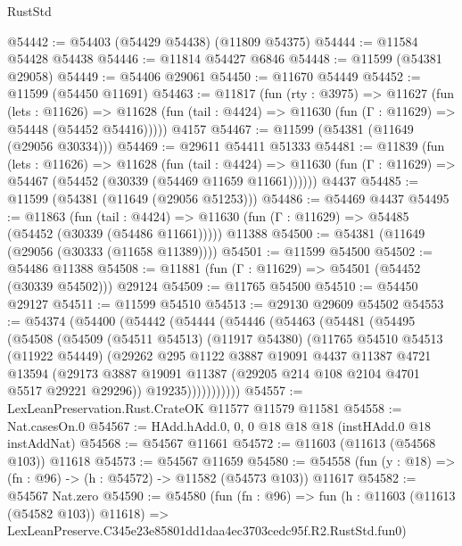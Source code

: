 \begin{lexlean}{RustStd}
\begin{coremodule}
@54442 := @54403 (@54429 @54438) (@11809 @54375)
@54444 := @11584 @54428 @54438
@54446 := @11814 @54427 @6846
@54448 := @11599 (@54381 @29058)
@54449 := @54406 @29061
@54450 := @11670 @54449
@54452 := @11599 (@54450 @11691)
@54463 := @11817
    (fun (rty : @3975) =>
    @11627
      (fun (lets : @11626) =>
      @11628 (fun (tail : @4424) => @11630 (fun (Γ : @11629) => @54448 (@54452 @54416)))))
    @4157
@54467 := @11599 (@54381 (@11649 (@29056 @30334)))
@54469 := @29611 @54411 @51333
@54481 := @11839
    (fun (lets : @11626) =>
    @11628
      (fun (tail : @4424) =>
      @11630 (fun (Γ : @11629) => @54467 (@54452 (@30339 (@54469 @11659 @11661))))))
    @4437
@54485 := @11599 (@54381 (@11649 (@29056 @51253)))
@54486 := @54469 @4437
@54495 := @11863
    (fun (tail : @4424) => @11630 (fun (Γ : @11629) => @54485 (@54452 (@30339 (@54486 @11661)))))
    @11388
@54500 := @54381 (@11649 (@29056 (@30333 (@11658 @11389))))
@54501 := @11599 @54500
@54502 := @54486 @11388
@54508 := @11881 (fun (Γ : @11629) => @54501 (@54452 (@30339 @54502))) @29124
@54509 := @11765 @54500
@54510 := @54450 @29127
@54511 := @11599 @54510
@54513 := @29130 @29609 @54502
@54553 := @54374
    (@54400
      (@54442
        (@54444
          (@54446
            (@54463
              (@54481
                (@54495
                  (@54508
                    (@54509
                      (@54511 @54513)
                      (@11917 @54380)
                      (@11765
                        @54510
                        @54513
                        (@11922 @54449)
                        (@29262
                          @295
                          @1122
                          @3887
                          @19091
                          @4437
                          @11387
                          @4721
                          @13594
                          (@29173
                            @3887
                            @19091
                            @11387
                            (@29205 @214 @108 @2104 @4701 @5517 @29221 @29296))
                          @19235)))))))))))
@54557 := LexLeanPreservation.Rust.CrateOK @11577 @11579 @11581
@54558 := Nat.casesOn.{0}
@54567 := HAdd.hAdd.{0, 0, 0} @18 @18 @18 (instHAdd.{0} @18 instAddNat)
@54568 := @54567 @11661
@54572 := @11603 (@11613 (@54568 @103)) @11618
@54573 := @54567 @11659
@54580 := @54558 (fun (y : @18) => (fn : @96) -> (h : @54572) -> @11582 (@54573 @103)) @11617
@54582 := @54567 Nat.zero
@54590 := @54580
    (fun (fn : @96) =>
    fun (h : @11603 (@11613 (@54582 @103)) @11618) =>
    LexLeanPreserve.C345e23e85801dd1daa4ec3703cedc95f.R2.RustStd.fun0)

\end{coremodule}
\end{lexlean}
